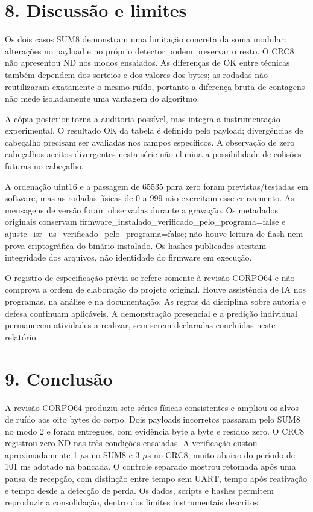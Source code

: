 \documentclass[11pt,a4paper]{article}
\begin{document}
\section*{8. Discussão e limites}

Os dois casos SUM8 demonstram uma limitação concreta da soma modular: alterações no payload e no próprio detector podem preservar o resto. O CRC8 não apresentou ND nos modos ensaiados. As diferenças de OK entre técnicas também dependem dos sorteios e dos valores dos bytes; as rodadas não reutilizaram exatamente o mesmo ruído, portanto a diferença bruta de contagens não mede isoladamente uma vantagem do algoritmo.


A cópia posterior torna a auditoria possível, mas integra a instrumentação experimental. O resultado OK da tabela é definido pelo payload; divergências de cabeçalho precisam ser avaliadas nos campos específicos. A observação de zero cabeçalhos aceitos divergentes nesta série não elimina a possibilidade de colisões futuras no cabeçalho.


A ordenação uint16 e a passagem de 65535 para zero foram previstas/testadas em software, mas as rodadas físicas de 0 a 999 não exercitam esse cruzamento. As mensagens de versão foram observadas durante a gravação. Os metadados originais conservam firmware\_instalado\_verificado\_pelo\_programa=false e ajuste\_isr\_us\_verificado\_pelo\_programa=false; não houve leitura de flash nem prova criptográfica do binário instalado. Os hashes publicados atestam integridade dos arquivos, não identidade do firmware em execução.


O registro de especificação prévia se refere somente à revisão CORPO64 e não comprova a ordem de elaboração do projeto original. Houve assistência de IA nos programas, na análise e na documentação. As regras da disciplina sobre autoria e defesa continuam aplicáveis. A demonstração presencial e a predição individual permanecem atividades a realizar, sem serem declaradas concluídas neste relatório.


\section*{9. Conclusão}

A revisão CORPO64 produziu sete séries físicas consistentes e ampliou os alvos de ruído aos oito bytes do corpo. Dois payloads incorretos passaram pelo SUM8 no modo 2 e foram entregues, com evidência byte a byte e resíduo zero. O CRC8 registrou zero ND nas três condições ensaiadas. A verificação custou aproximadamente 1 \ensuremath{\mu}s no SUM8 e 3 \ensuremath{\mu}s no CRC8, muito abaixo do período de 101 ms adotado na bancada. O controle separado mostrou retomada após uma pausa de recepção, com distinção entre tempo sem UART, tempo após reativação e tempo desde a detecção de perda. Os dados, scripts e hashes permitem reproduzir a consolidação, dentro dos limites instrumentais descritos.
\end{document}

